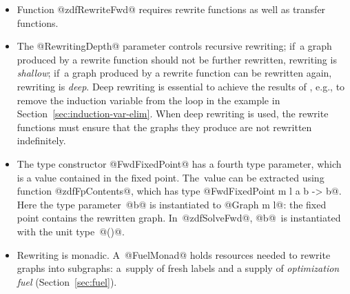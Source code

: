 \documentclass[blockstyle,preprint,natbib,nocopyrightspace]{sigplanconf}
\def\authornote#1{\unskip\relax}
\newcommand{\simon}[1]{\authornote{SLPJ: #1}}
\newcommand\secref[1]{Section~\ref{sec:#1}}
\newcommand\seclabel[1]{\label{sec:#1}}
\begin{document}
\begin{itemize}
\item
Function @zdfRewriteFwd@ requires rewrite functions as well as transfer
functions.
\item
The @RewritingDepth@ parameter controls recursive rewriting;
if~a graph produced by a rewrite function should not be further rewritten,
rewriting is \emph{shallow};
if~a graph produced by a rewrite function can be rewritten again,
rewriting is \emph{deep}.
Deep rewriting is essential to achieve the results of
\citet{lerner-grove-chambers:2002}, e.g., to remove the induction
variable from the loop in the example in \secref{induction-var-elim}.
When deep rewriting is used, the rewrite functions must
ensure that the graphs they produce are not rewritten indefinitely.
\item
The type constructor @FwdFixedPoint@ has a fourth
type parameter,
which is a value contained in the fixed point.
The~value can be extracted using function @zdfFpContents@, which has
type @FwdFixedPoint m l a b -> b@.
Here the type parameter~@b@ is instantiated to @Graph m l@: the fixed point
contains the rewritten graph.
In~@zdfSolveFwd@, @b@~is instantiated with
the unit type~@()@.
\simon{We can't make this point until later, where we say that solve is
implemented using rewrite.  NR: I don't understand why not.
We are explaining the meaning of the final type parameter to
@FwdFixedPoint@, as promised.}
\item
Rewriting is monadic.
A~@FuelMonad@ holds resources needed to
rewrite graphs into subgraphs:
a~supply of fresh labels and a supply of \emph{optimization fuel}
(\secref{fuel}). 
\end{itemize}


\seclabel{dfengine-spec}
\end{document}
